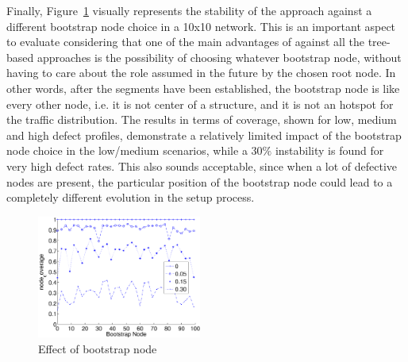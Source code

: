Finally, Figure~\ref{fig:results_bootstrap} visually represents the
stability of the approach against a different bootstrap node choice
in a 10x10 network. This is an important aspect to evaluate 
considering that one of the main advantages of \disr{} against all the
tree-based approaches is the possibility of choosing whatever
bootstrap node, without having to care about the role assumed in the
future by the chosen root node. In other words, after the segments have
been established, the bootstrap node is like every other node, i.e. it
is not center of a structure, and it is not an hotspot for the traffic
distribution. The results in terms of coverage, shown for low, medium
and high defect profiles, demonstrate a relatively limited
impact of the bootstrap node choice in the low/medium scenarios, while a
$30\%$ instability is found for very high defect rates. This also
sounds acceptable, since when a lot of defective nodes are present, the
particular position of the bootstrap node could lead to a completely
different evolution in the \disr{} setup process.

\begin{figure}
\centering
\includegraphics[width=0.48\textwidth]{pictures/set3.eps}
\caption{Effect of bootstrap node}
\label{fig:results_bootstrap}
\end{figure}

